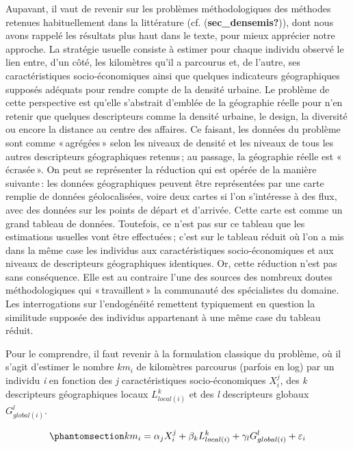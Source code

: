 \documentclass[
  9pt,
  a4paper,
  DIV=11]{scrreprt}
\begin{document}
Aupavant, il vaut de revenir sur les problèmes méthodologiques des
méthodes retenues habituellement dans la littérature (cf.
(\textbf{sec\_densemis?})), dont nous avons rappelé les résultats plus
haut dans le texte, pour mieux apprécier notre approche. La stratégie
usuelle consiste à estimer pour chaque individu observé le lien entre,
d'un côté, les kilomètres qu'il a parcourus et, de l'autre, ses
caractéristiques socio-économiques ainsi que quelques indicateurs
géographiques supposés adéquats pour rendre compte de la densité
urbaine. Le problème de cette perspective est qu'elle s'abstrait
d'emblée de la géographie réelle pour n'en retenir que quelques
descripteurs comme la densité urbaine, le design, la diversité ou encore
la distance au centre des affaires. Ce faisant, les données du problème
sont comme «\,agrégées\,» selon les niveaux de densité et les niveaux de
tous les autres descripteurs géographiques retenus\,; au passage, la
géographie réelle est «\,écrasée\,». On peut se représenter la réduction
qui est opérée de la manière suivante\,: les données géographiques
peuvent être représentées par une carte remplie de données
géolocalisées, voire deux cartes si l'on s'intéresse à des flux, avec
des données sur les points de départ et d'arrivée. Cette carte est comme
un grand tableau de données. Toutefois, ce n'est pas sur ce tableau que
les estimations usuelles vont être effectuées\,; c'est sur le tableau
réduit où l'on a mis dans la même case les individus aux
caractéristiques socio-économiques et aux niveaux de descripteurs
géographiques identiques. Or, cette réduction n'est pas sans
conséquence. Elle est au contraire l'une des sources des nombreux doutes
méthodologiques qui «\,travaillent\,» la communauté des spécialistes du
domaine. Les interrogations sur l'endogénéité remettent typiquement en
question la similitude supposée des individus appartenant à une même
case du tableau réduit.

Pour le comprendre, il faut revenir à la formulation classique du
problème, où il s'agit d'estimer le nombre \(km_i\) de kilomètres
parcourus (parfois en log) par un individu \emph{i} en fonction des
\emph{j} caractéristiques socio-économiques \(X_i^j\), des \emph{k}
descripteurs géographiques locaux \(L_{local(i)}^k\) et des \emph{l}
descripteurs globaux \(G_{global(i)}^l\).

\begin{equation}\phantomsection\label{eq-orthodoxe}{ km_i = \alpha_j X_i^j + \beta_k L^k_{local(i)} + \gamma_l G^l_{global(i)} + \varepsilon_i }\end{equation}
\end{document}
